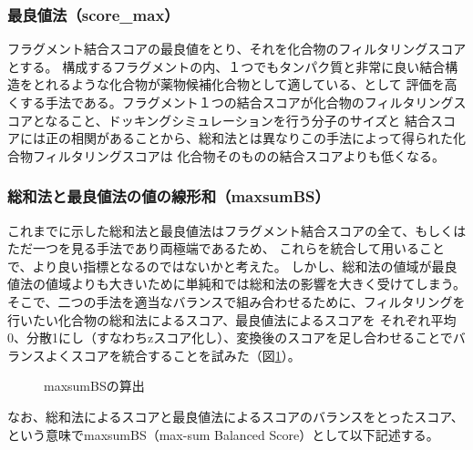 \subsubsection{最良値法（score\_max）}
フラグメント結合スコアの最良値をとり、それを化合物のフィルタリングスコアとする。
構成するフラグメントの内、１つでもタンパク質と非常に良い結合構造をとれるような化合物が薬物候補化合物として適している、として
評価を高くする手法である。フラグメント１つの結合スコアが化合物のフィルタリングスコアとなること、ドッキングシミュレーションを行う分子のサイズと
結合スコアには正の相関がある\cite{Verdonk2004}ことから、総和法とは異なりこの手法によって得られた化合物フィルタリングスコアは
化合物そのものの結合スコアよりも低くなる。

\subsubsection{総和法と最良値法の値の線形和（maxsumBS）}
これまでに示した総和法と最良値法はフラグメント結合スコアの全て、もしくはただ一つを見る手法であり両極端であるため、
これらを統合して用いることで、より良い指標となるのではないかと考えた。
しかし、総和法の値域が最良値法の値域よりも大きいために単純和では総和法の影響を大きく受けてしまう。
そこで、二つの手法を適当なバランスで組み合わせるために、フィルタリングを行いたい化合物の総和法によるスコア、最良値法によるスコアを
それぞれ平均0、分散1にし（すなわちzスコア化し）、変換後のスコアを足し合わせることでバランスよくスコアを統合することを試みた（図\ref{fig:maxsumBS}）。
\begin{figure}[htp]
 \begin{center}
  \caption{maxsumBSの算出}
  \label{fig:maxsumBS}
 \end{center}
\end{figure}
なお、総和法によるスコアと最良値法によるスコアのバランスをとったスコア、という意味でmaxsumBS（max-sum Balanced Score）として以下記述する。